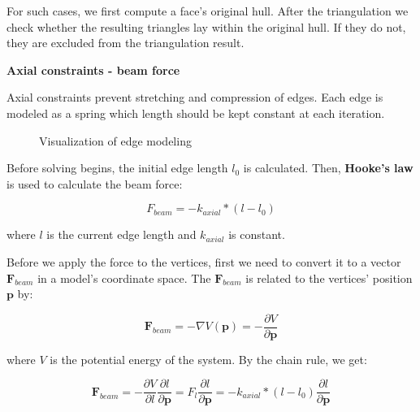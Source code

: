 For such cases, we first compute a face's original hull. After the triangulation we check whether the resulting triangles
lay within the original hull. If they do not, they are excluded from the triangulation result.

\textbf{Axial constraints - beam force}
\smallskip

Axial constraints prevent stretching and compression of edges. 
Each edge is modeled as a spring which length should be kept constant at each iteration.

\begin{figure}[H]
	\caption{Visualization of edge modeling}
    \centering
    \qquad
\end{figure}

Before solving begins, the initial edge length $l_{0}$ is calculated.
Then, \textbf{Hooke's law} is used to calculate the beam force:

$$F_{beam} = -k_{axial} * (l - l_{0})$$

where $l$ is the current edge length and $k_{axial}$ is constant.

\smallskip
Before we apply the force to the vertices, first we need to convert it to a vector $\pmb{F}_{beam}$ in a model's coordinate space.
The $\pmb{F}_{beam}$ is related to the vertices' position $\pmb{p}$ by:

$$\pmb{F}_{beam} = -\nabla V(\pmb{p}) = -\frac{\partial V}{\partial \pmb{p}}$$

where $V$ is the potential energy of the system. By the chain rule, we get:

\begin{equation} \label{Solver:beam_force}
\pmb{F}_{beam} = -\frac{\partial V}{\partial l}\frac{\partial l}{\partial \pmb{p}} = F_{l}\frac{\partial l}{\partial \pmb{p}} = -k_{axial} * (l - l_{0})\frac{\partial l}{\partial \pmb{p}}
\end{equation}


